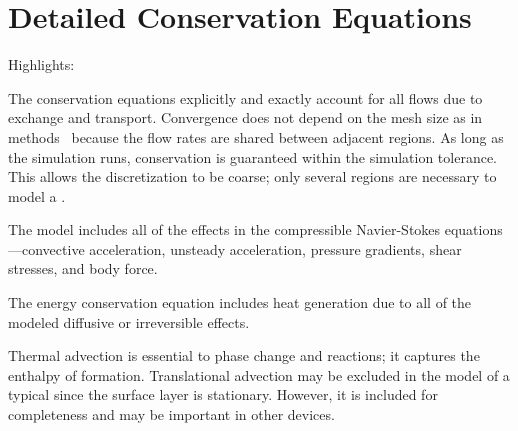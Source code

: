 \clearpage %
\section{Detailed Conservation Equations}
\label{sec:DetailedConservation}

\begin{contextbox}
  Highlights:
  \begin{itemize*}
    \item The conservation equations explicitly and exactly account for all flows due to exchange and transport.  Convergence does not depend on the mesh size as in  methods~\cite{Celia1990} because the flow rates are shared between adjacent regions.  As long as the simulation runs, conservation is guaranteed within the simulation tolerance.  This allows the discretization to be coarse; only several regions are necessary to model a .
    \item The model includes all of the effects in the compressible Navier-Stokes equations---convective acceleration, unsteady acceleration, pressure gradients, shear stresses, and body force.
    \item The energy conservation equation includes heat generation due to all of the modeled diffusive or irreversible effects.
    \item Thermal advection is essential to phase change and reactions; it captures the enthalpy of formation.  Translational advection may be excluded in the model of a typical  since the surface layer is stationary.  However, it is included for completeness and may be important in other devices.
  \end{itemize*}
\end{contextbox}
\vspace{0.7\baselineskip}


